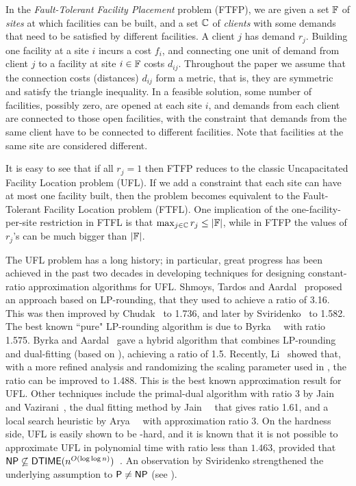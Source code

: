 \documentclass[11pt]{article}
\begin{document}
In the \emph{Fault-Tolerant Facility Placement} problem
(FTFP), we are given a set $\mathbb{F}$ of \emph{sites} at
which facilities can be built, and a set $\mathbb{C}$ of
\emph{clients} with some demands that need to be satisfied
by different facilities. A client $j$ has demand
$r_j$. Building one facility at a site $i$ incurs a cost
$f_i$, and connecting one unit of demand from client $j$ to
a facility at site $i\in\mathbb{F}$ costs $d_{ij}$. Throughout the
paper we assume that the connection costs (distances)
$d_{ij}$ form a metric, that is, they are
symmetric and satisfy the triangle inequality. In a feasible solution, some
number of facilities, possibly zero, are opened at each site
$i$, and demands from each client are connected to those
open facilities, with the constraint that demands from the
same client have to be connected to different
facilities. Note that facilities at the same site are considered different.

It is easy to see that if all $r_j=1$ then FTFP reduces to
the classic Uncapacitated Facility Location problem (UFL).
If we add a constraint that each site can have at most one
facility built, then the problem becomes equivalent to the
Fault-Tolerant Facility Location problem (FTFL). One
implication of the one-facility-per-site restriction in FTFL
is that $\max_{j\in\mathbb{C}}r_j \leq |\mathbb{F}|$, while
in FTFP the values of $r_j$'s can be much bigger than
$|\mathbb{F}|$.

The UFL problem has a long history; in particular, great
progress has been achieved in the past two decades in
developing techniques for designing constant-ratio
approximation algorithms for UFL.  Shmoys, Tardos and
Aardal~\cite{ShmoysTA97} proposed an approach based on
LP-rounding, that they used to achieve a ratio of 3.16.
This was then improved by Chudak~\cite{ChudakS04} to 1.736,
and later by Sviridenko~\cite{Svi02} to 1.582.
The best known ``pure" LP-rounding algorithm is due to
Byrka~{\etal}~\cite{ByrkaGS10} with ratio 1.575. 
Byrka and Aardal~\cite{ByrkaA10} gave a hybrid algorithm that combines LP-rounding
and dual-fitting (based on \cite{JainMMSV03}), achieving a ratio of 1.5.  Recently,
Li~\cite{Li11} showed that, with a more refined analysis and
randomizing the scaling parameter used in \cite{ByrkaA10}, the ratio can be improved
to 1.488. This is the best known approximation result for UFL.  
Other techniques include the primal-dual algorithm with ratio 3 by
Jain and Vazirani~\cite{JainV01}, the dual fitting method by
Jain~{\etal}~\cite{JainMMSV03} that gives ratio 1.61, and a
local search heuristic by Arya~{\etal}~\cite{AryaGKMMP04}
with approximation ratio 3.  On the hardness side, UFL is
easily shown to be {\NP}-hard, and it is known that it is
not possible to approximate UFL in polynomial time with
ratio less than $1.463$, provided that
${\mbox{\sf NP}}\not\subseteq{\mbox{\sf DTIME}}(n^{O(\log\log
  n)})$~\cite{GuhaK98}. An observation by Sviridenko
strengthened the underlying assumption to ${\mbox{\sf P}}\ne {\mbox{\sf NP}}$ (see \cite{vygen05}).
\end{document}
